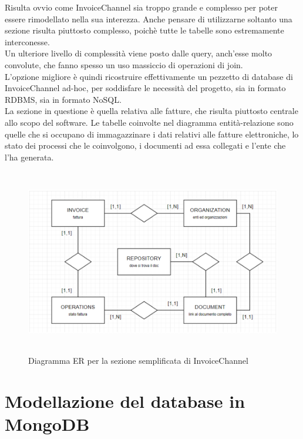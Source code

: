 \noindent Risulta ovvio come InvoiceChannel sia troppo grande e complesso per poter essere rimodellato nella sua interezza. Anche pensare di utilizzarne soltanto una sezione risulta piuttosto complesso, poichè tutte le tabelle sono estremamente interconesse.\\
Un ulteriore livello di complessità viene posto dalle query, anch'esse molto convolute, che fanno spesso un uso massiccio di operazioni di join.\\
L'opzione migliore è quindi ricostruire effettivamente un pezzetto di database di InvoiceChannel ad-hoc, per soddisfare le necessità del progetto, sia in formato RDBMS, sia in formato NoSQL.\\

\noindent La sezione in questione è quella relativa alle fatture, che risulta piuttosto centrale allo scopo del software. Le tabelle coinvolte nel diagramma entità-relazione sono quelle che si occupano di immagazzinare i dati relativi alle fatture elettroniche, lo stato dei processi che le coinvolgono, i documenti ad essa collegati e l'ente che l'ha generata.

\begin{figure}[htbp]
\begin{center}
\includegraphics[height=22em]{immagini/ER-Mock-IC.png}
\caption{Diagramma ER per la sezione semplificata di InvoiceChannel}
\end{center}
\end{figure}



\section{Modellazione del database in MongoDB}